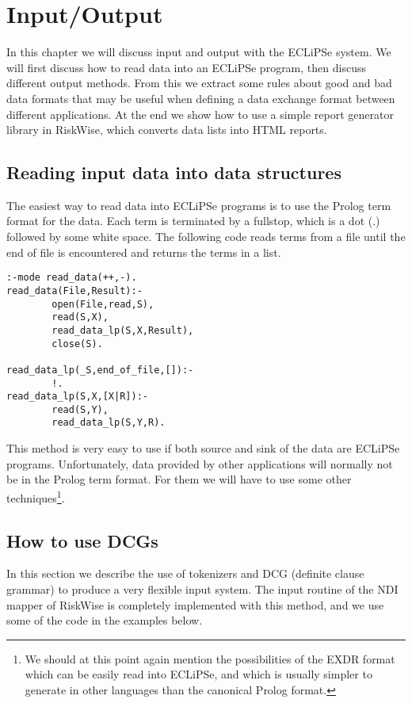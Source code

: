 \documentclass[a4paper,12pt]{report}
\begin{document}
\chapter{Input/Output}
\label{inputoutput}

In this chapter we will discuss input and output with the ECLiPSe system. We will first discuss how to read data into an ECLiPSe program, then discuss different output methods. From this we extract some rules about good and bad data formats that may be useful when defining a data exchange format between different applications. At the end we show how to use a simple report generator library in RiskWise, which converts data lists into HTML reports.

\section{Reading input data into data structures}
\label{ReadingInput}
The easiest way to read data into ECLiPSe programs is to use the Prolog term format for the data. Each term is terminated by a fullstop, which is a dot (.) followed by some white space. The following code reads terms from a file until the end of file is encountered and returns the terms in a list.
\begin{verbatim}
:-mode read_data(++,-).
read_data(File,Result):-
        open(File,read,S),
        read(S,X),
        read_data_lp(S,X,Result),
        close(S).

read_data_lp(_S,end_of_file,[]):-
        !.
read_data_lp(S,X,[X|R]):-
        read(S,Y),
        read_data_lp(S,Y,R).
\end{verbatim}
This method is very easy to use if both source and sink of the data are ECLiPSe programs. Unfortunately, data provided by other applications will normally not be in the Prolog term format. For them we will have to use some other techniques\footnote{We should at this point again mention the possibilities of the EXDR format which can be easily read into ECLiPSe, and which is usually simpler to generate in other languages than the canonical Prolog format.}.

\section{How to use DCGs}
\label{howtousedcgs}

In this section we describe the use of tokenizers and DCG (definite clause grammar) to produce a very flexible input system. The input routine of the NDI mapper of RiskWise is completely implemented with this method, and we use some of the code in the examples below.
\end{document}
